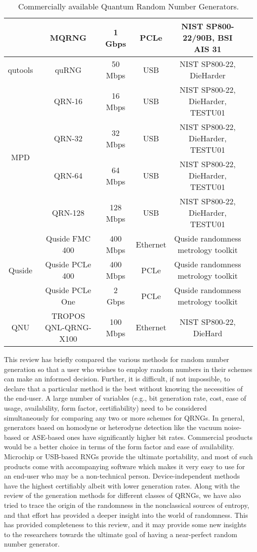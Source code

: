 \documentclass[]{interact}
\theoremstyle{plain}%
\theoremstyle{definition}
\theoremstyle{remark}
\begin{document}
\begin{table}
{\begin{tabular}{|c|c|c|c|c|c|}
&MQRNG&1 Gbps& PCLe &NIST SP800-22/90B, BSI AIS 31\\\hline
qutools \cite{quRNGdat53:online}&quRNG&50 Mbps& USB&NIST SP800-22, DieHarder\\\hline
\multirow{4}{*}{MPD \cite{MicroPho90:online}}
&QRN-16&16 Mbps&USB&NIST SP800-22, DieHarder, TESTU01\\
&QRN-32&32 Mbps&USB&NIST SP800-22, DieHarder, TESTU01\\
&QRN-64&64 Mbps&USB&NIST SP800-22, DieHarder, TESTU01\\
&QRN-128&128 Mbps&USB&NIST SP800-22, DieHarder, TESTU01\\\hline
\multirow{3}{*}{Quside \cite{quside:online}}
&Quside FMC 400&400 Mbps&Ethernet&Quside randomness metrology toolkit\\
&Quside PCLe 400&400 Mbps&PCLe&Quside randomness metrology toolkit\\
&Quside PCLe One&2 Gbps&PCLe&Quside randomness metrology toolkit\\\hline
QNU \cite{qnu}&TROPOS QNL-QRNG-X100&100 Mbps&Ethernet&NIST SP800-22, DieHard\\\hline
\end{tabular}}
\caption{Commercially available Quantum Random Number Generators.}
\label{tab:comtab}
\end{table}

This review has briefly compared the various methods for random number generation so that a user who wishes to employ random numbers in their schemes can make an informed decision. Further, it is difficult, if not impossible, to declare that a particular method is the best without knowing the necessities of the end-user. A large number of variables (e.g., bit generation rate, cost, ease of usage, availability, form factor, certifiability) need to be considered simultaneously for comparing any two or more schemes for QRNGs. In general, generators based on homodyne or heterodyne detection like the vacuum noise-based or ASE-based ones have significantly higher bit rates. Commercial products would be a better choice in terms of the form factor and ease of availability. Microchip or USB-based RNGs provide the ultimate portability, and most of such products come with accompanying software which makes it very easy to use for an end-user who may be a non-technical person. Device-independent methods have the highest certifiably albeit with lower generation rates. Along with the review of the generation methods for different classes of QRNGs, we have also tried to trace the origin of the randomness in the nonclassical sources of entropy, and that effort has provided a deeper insight into the world of randomness. This has provided completeness to this review, and it may provide some new insights to the researchers towards the ultimate goal of having a near-perfect random number generator.
\end{document}
